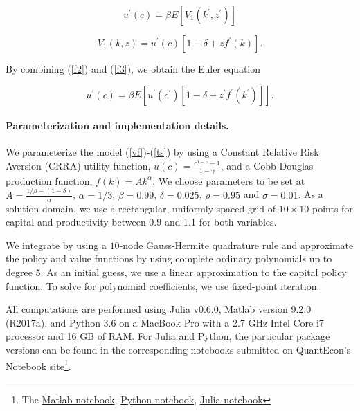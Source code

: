 \begin{equation}
  u^{\prime}\left(c\right) = \beta E \left[ V_{1}\left(k^{\prime }, z^{\prime}\right) \right] \label{f2}
\end{equation}

\begin{equation}
  V_{1}\left(k, z\right) = u^{\prime }\left( c\right) \left[ 1-\delta + zf^{\prime }\left( k\right) \right]. \label{f3}
\end{equation}%

By combining (\ref{f2}) and (\ref{f3}), we obtain the Euler equation%

\begin{equation}
  u^{\prime }\left(c\right) = \beta E\left[ u^{\prime }\left( c^{\prime}\right) \left[ 1-\delta +z^{\prime }f^{\prime }\left( k^{\prime} \right) \right] \right]. \label{f23}
\end{equation}

\paragraph{Parameterization and implementation details.}

We parameterize the model (\ref{vf})-(\ref{ts}) by using a Constant Relative
Risk Aversion (CRRA) utility function, $u\left( c\right) =\frac{c^{1-\gamma
}-1}{1-\gamma }$, and a Cobb-Douglas production function, $f\left( k\right)
=Ak^{\alpha }$. We choose parameters to be set at $A=\frac{1/\beta -(1-\delta
)}{\alpha }$, $\alpha =1/3$, $\beta =0.99$, $\delta =0.025$, $ \rho =0.95$ and
$\sigma =0.01$. As a solution domain, we use a rectangular, uniformly spaced
grid of $10\times 10$ points for capital and productivity between 0.9 and 1.1
for both variables.

We integrate by using a $10$-node Gauss-Hermite quadrature rule and approximate
the policy and value functions by using complete ordinary polynomials up to
degree 5. As an initial guess, we use a linear approximation to the capital
policy function. To solve for polynomial coefficients, we use fixed-point
iteration.

All computations are performed using Julia v0.6.0, Matlab version 9.2.0
(R2017a), and Python 3.6 on a MacBook Pro with a 2.7 GHz Intel Core i7
processor and 16 GB of RAM. For Julia and Python, the particular package
versions can be found in the corresponding notebooks submitted on QuantEcon's Notebook site\footnote{The
\href{http://notes.quantecon.org/submission/5b5f71779cd7f00015be6350}{Matlab notebook},
\href{http://notes.quantecon.org/submission/5b5f70db9cd7f00015be634e}{Python notebook},
\href{http://notes.quantecon.org/submission/5b5f711d9cd7f00015be634f}{Julia notebook}}.


